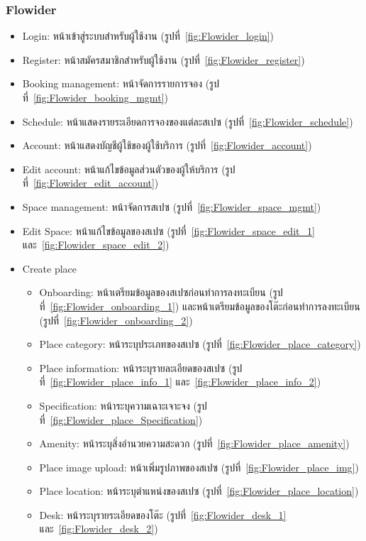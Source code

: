 \subsubsection{Flowider}
\begin{itemize}
    \item Login: หน้าเข้าสู่ระบบสําหรับผู้ใช้งาน (รูปที่~\ref{fig:Flowider_login})
    \item Register: หน้าสมัครสมาชิกสําหรับผู้ใช้งาน (รูปที่~\ref{fig:Flowider_register})
    \item Booking management: หน้าจัดการรายการจอง (รูปที่~\ref{fig:Flowider_booking_mgmt})
    \item Schedule: หน้าแสดงรายระเอียดการจองของแต่ละสเปซ (รูปที่~\ref{fig:Flowider_schedule})
    \item Account: หน้าแสดงบัญชีผู้ใช้ของผู้ใช้บริการ (รูปที่~\ref{fig:Flowider_account})
    \item Edit account: หน้าแก้ไขข้อมูลส่วนตัวของผู้ให้บริการ (รูปที่~\ref{fig:Flowider_edit_account})
    \item Space management: หน้าจัดการสเปซ (รูปที่~\ref{fig:Flowider_space_mgmt})
    \item Edit Space: หน้าแก้ไขข้อมูลของสเปซ (รูปที่~\ref{fig:Flowider_space_edit_1} และ~\ref{fig:Flowider_space_edit_2})
    \item Create place
    \begin{itemize}
        \item Onboarding: หน้าเตรียมข้อมูลของสเปซก่อนทําการลงทะเบียน (รูปที่~\ref{fig:Flowider_onboarding_1}) และหน้าเตรียมข้อมูลของโต๊ะก่อนทําการลงทะเบียน (รูปที่~\ref{fig:Flowider_onboarding_2})
        \item Place category: หน้าระบุประเภทของสเปซ (รูปที่~\ref{fig:Flowider_place_category})
        \item Place information: หน้าระบุรายละเอียดของสเปซ (รูปที่~\ref{fig:Flowider_place_info_1} และ~\ref{fig:Flowider_place_info_2})
        \item Specification: หน้าระบุความเฉาะเจาะจง (รูปที่~\ref{fig:Flowider_place_Specification})
        \item Amenity: หน้าระบุสิ่งอํานวยความสะดวก (รูปที่~\ref{fig:Flowider_place_amenity})
        \item Place image upload: หน้าเพิ่มรูปภาพของสเปซ (รูปที่~\ref{fig:Flowider_place_img})
        \item Place location: หน้าระบุตําแหน่งของสเปซ (รูปที่~\ref{fig:Flowider_place_location})
        \item Desk: หน้าระบุรายระเอียดของโต๊ะ (รูปที่~\ref{fig:Flowider_desk_1} และ~\ref{fig:Flowider_desk_2})
    \end{itemize}
\end{itemize}

